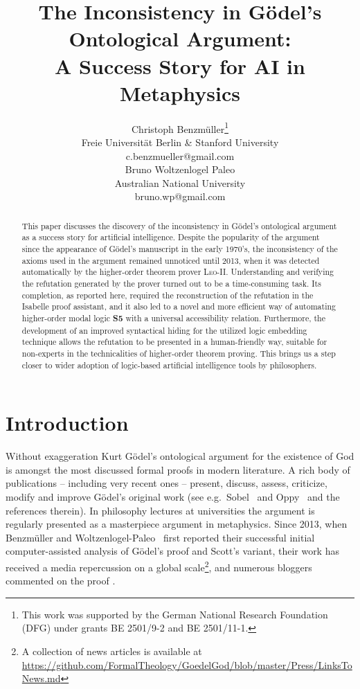 \documentclass{article}
\title{The Inconsistency in G\"odel's Ontological Argument: \\ A Success Story for AI in Metaphysics}
\author{
  \begin{minipage}{0.5\textwidth}\centering
    Christoph Benzm\"uller\thanks{This work was supported by the 
                                  German National Research Foundation (DFG) under
                                  grants BE 2501/9-2 and BE 2501/11-1.} \\
    \normalfont Freie Universit\"at Berlin \& Stanford University\\
    c.benzmueller@gmail.com
  \end{minipage}
  \begin{minipage}{0.5\textwidth}\centering
    Bruno Woltzenlogel Paleo \\
    \normalfont Australian National University\\
    bruno.wp@gmail.com
  \end{minipage}
}
\begin{document}
\maketitle

\begin{abstract}
  This paper discusses the discovery of the inconsistency in G\"odel's
  ontological argument as a success story for artificial
  intelligence. Despite the popularity of the argument since the
  appearance of G\"odel's manuscript in the early 1970's, the
  inconsistency of the axioms used in the argument remained unnoticed
  until 2013, when it was detected automatically by the higher-order
  theorem prover \textsc{Leo-II}.  Understanding and verifying the
  refutation generated by the prover turned out to be a time-consuming
  task. Its completion, as reported here, required the
  reconstruction of the refutation in the Isabelle proof assistant, and it
  also led to a novel and more efficient way of automating
  higher-order modal logic \textbf{S5} with a universal accessibility
  relation. Furthermore, the development of an improved syntactical
  hiding for the utilized logic embedding technique allows the refutation to be
  presented in a human-friendly way, suitable for non-experts in the
  technicalities of higher-order theorem proving. This brings us a
  step closer to wider adoption of logic-based artificial intelligence
  tools by philosophers.
\end{abstract}


\section{Introduction}\label{sec:introduction}
Without exaggeration Kurt G\"{o}del's ontological
argument for the existence of God \cite{GoedelNotes,ScottNotes} is
amongst the most discussed formal proofs in modern literature. A rich
body of publications -- including very recent ones -- present,
discuss, assess, criticize, modify and improve G\"{o}del's original
work (see e.g.~Sobel~ and Oppy~ and the
references therein).  In philosophy lectures at universities the
argument is regularly presented as a masterpiece argument in
metaphysics. Since 2013, when Benzm\"uller and Woltzenlogel-Paleo~ first
reported their successful initial computer-assisted
analysis of G\"odel's proof and Scott's variant,
their work has received a media repercussion on a global scale\footnote{A
  collection of news articles is available at {\scriptsize
    \url{https://github.com/FormalTheology/GoedelGod/blob/master/Press/LinksToNews.md}}},
and numerous bloggers commented on the proof
\cite{fuhrmann15:_blogg_goedel}.
\end{document}
